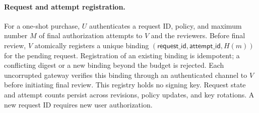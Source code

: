 \documentclass{article}
\begin{document}
\paragraph{Request and attempt registration.}
For a one-shot purchase, $U$ authenticates a request ID, policy, and maximum
number $M$ of final authorization attempts to $V$ and the reviewers.
Before final review, $V$ atomically registers a unique binding
$(\mathsf{request\_id},\mathsf{attempt\_id},H(m))$ for the pending request.
Registration of an existing binding is idempotent; a conflicting digest or a
new binding beyond the budget is rejected. Each uncorrupted gateway verifies
this binding through an authenticated channel to $V$ before initiating final
review. This registry holds no signing key. Request state and attempt counts
persist across revisions, policy updates, and key rotations. A new request ID
requires new user authorization.
\end{document}
